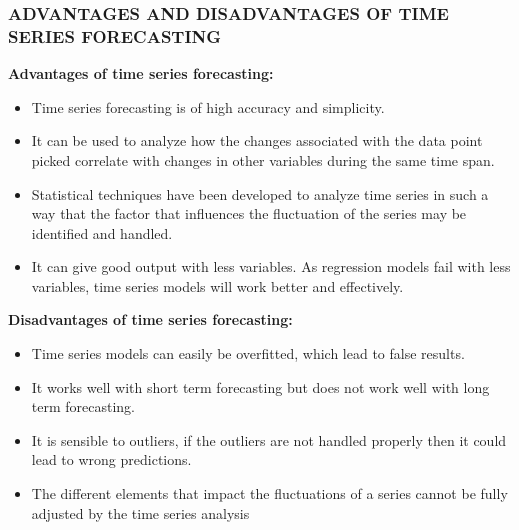\documentclass[10pt]{report}
\begin{document}
\begin{flushleft}
		\subsubsection{ADVANTAGES AND DISADVANTAGES OF TIME SERIES FORECASTING}
		\textbf{Advantages of time series forecasting:}
		\begin{itemize}
		\item	Time series forecasting is of high accuracy and simplicity.
		\item	 It can be used to analyze how the changes associated with the data point picked correlate with changes in other variables during the same time span.
		\item	Statistical techniques have been developed to analyze time series in such a way that the factor that influences the fluctuation of the series may be identified and handled.
		\item	It can give good output with less variables. As regression models fail with less variables, time series models will work better and effectively.
		\end{itemize}
		\textbf{Disadvantages of time series forecasting:}
		\begin{itemize}
			\item 	Time series models can easily be overfitted, which lead to false results.
			\item	It works well with short term forecasting but does not work well with long term forecasting.
			\item	It is sensible to outliers, if the outliers are not handled properly then it could lead to wrong predictions.
			\item	The different elements that impact the fluctuations of a series cannot be fully adjusted by the time series analysis
		\end{itemize}

		

\end{flushleft}
\end{document}
